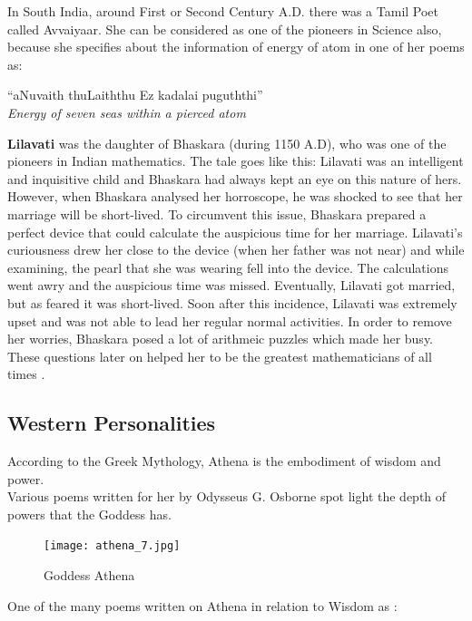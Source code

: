 \documentclass[a4paper,10pt]{article}
\begin{document}
In South India, around First or Second Century A.D. there was a Tamil Poet called Avvaiyaar. She can be considered as one of the pioneers in Science also, because she specifies about the information of energy of atom in one of her poems as: \\
\begin{center}
``aNuvaith thuLaiththu Ez kadalai puguththi'' \\
\textit{Energy of seven seas within a pierced atom}\\
\end{center}


\textbf{Lilavati} was the daughter of Bhaskara (during 1150 A.D), who was one of the pioneers in Indian mathematics. The tale goes like this: Lilavati was an intelligent and inquisitive child and Bhaskara had always kept an eye on this nature of hers. However, when Bhaskara analysed her horroscope, he was shocked to see that her marriage will be short-lived. To circumvent this issue, Bhaskara prepared a perfect device that could calculate the auspicious time for her marriage. Lilavati's curiousness drew her close to the device (when her father was not near) and while examining, the pearl that she was wearing fell into the device. The calculations went awry and the auspicious time was missed. Eventually, Lilavati got married, but as feared it was short-lived. Soon after this incidence, Lilavati was extremely upset and was not able to lead her regular normal activities. In order to remove her worries, Bhaskara posed a lot of arithmeic puzzles which made her busy. These questions later on helped her to be the 
greatest mathematicians of all times \cite{lilavati}. 

\subsection{Western Personalities}
\newblock
According to the Greek Mythology, Athena is the embodiment of wisdom and power.\\
Various poems written for her by Odysseus G. Osborne spot light the depth of powers that the Goddess has.\\
\begin{center}
\begin{figure}[h]
\centering
 \texttt{[image: athena\_7.jpg]}
 \caption{Goddess Athena}
\end{figure}
\end{center}

One of the many poems written on Athena in relation to Wisdom as \cite{athena}:\\
\end{document}
